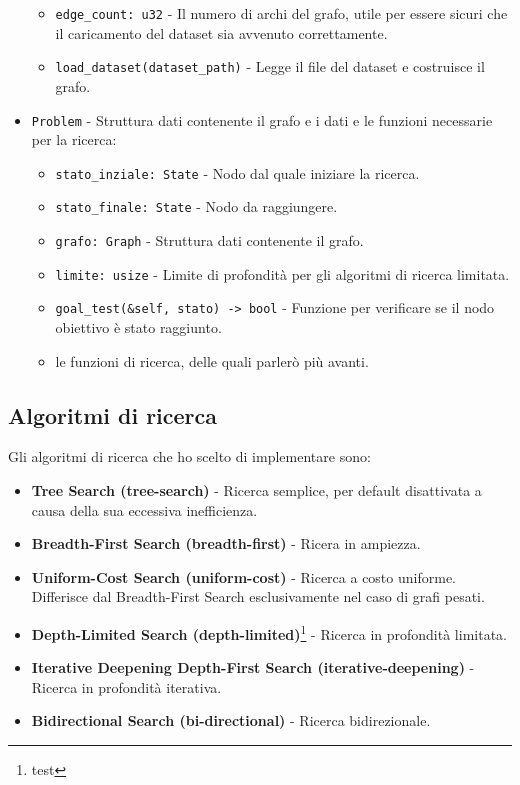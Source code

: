 \documentclass{article}
\begin{document}
\begin{itemize}
\begin{itemize}
		      \item \texttt{edge\_count: u32} - Il numero di archi del grafo, utile per essere sicuri che il caricamento del dataset sia avvenuto correttamente.
		      \item \texttt{load\_dataset(dataset\_path)} - Legge il file del dataset e costruisce il grafo.
	      \end{itemize}
	\item \texttt{Problem} - Struttura dati contenente il grafo e i dati e le funzioni necessarie per la ricerca:
	      \begin{itemize}
		      \item \texttt{stato\_inziale: State} - Nodo dal quale iniziare la ricerca.
		      \item \texttt{stato\_finale: State} - Nodo da raggiungere.
		      \item \texttt{grafo: Graph} - Struttura dati contenente il grafo.
		      \item \texttt{limite: usize} - Limite di profondità per gli algoritmi di ricerca limitata.
		      \item \texttt{goal\_test(\&self, stato) -> bool} - Funzione per verificare se il nodo obiettivo è stato raggiunto.
		      \item le funzioni di ricerca, delle quali parlerò più avanti.
	      \end{itemize}
\end{itemize}
\newpage
\subsection{Algoritmi di ricerca}
Gli algoritmi di ricerca che ho scelto di implementare sono:
\begin{itemize}
	\item \textbf{Tree Search (tree-search)} - Ricerca semplice, per default disattivata a causa della sua eccessiva inefficienza.
	\item \textbf{Breadth-First Search (breadth-first)} - Ricera in ampiezza.
	\item \textbf{Uniform-Cost Search (uniform-cost)} - Ricerca a costo uniforme. Differisce dal Breadth-First Search esclusivamente nel caso di grafi pesati.
	\item \textbf{Depth-Limited Search (depth-limited)}\footnote{test} - Ricerca in profondità limitata.
	\item \textbf{Iterative Deepening Depth-First Search (iterative-deepening)} - Ricerca in profondità iterativa.
	\item \textbf{Bidirectional Search (bi-directional)} - Ricerca bidirezionale.
\end{itemize}
\end{document}
